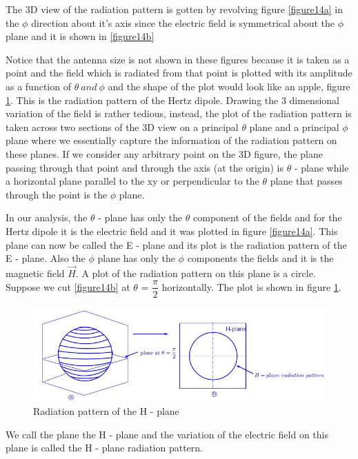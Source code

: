 The 3D view of the radiation pattern is gotten by revolving figure \ref{figure14a} in the $\phi$ direction about it's axis since the electric field is symmetrical about the $\phi$ plane and it is shown in \ref{figure14b}

Notice that the antenna size is not shown in these figures because it is taken as a point and the field which is radiated from that point is plotted with its amplitude as a function of $\theta \ and \ \phi$ and the shape of the plot would look like an apple, figure \ref{figure15}. This is the radiation pattern of the Hertz dipole. Drawing the 3 dimensional variation of the field is rather tedious, instead, the plot of the radiation pattern is taken across two sections of the 3D view on a principal $\theta$ plane and a principal $\phi$ plane where we essentially capture the information of the radiation pattern on these planes. If we consider any arbitrary point on the 3D figure, the plane passing through that point and through the axis (at the origin) is $\theta$ - plane while a horizontal plane parallel to the xy or perpendicular to the $\theta$ plane that passes through the point is the $\phi$ plane. 

In our analysis, the $\theta$ - plane has only the $\theta$ component of the fields and for the Hertz dipole it is the electric field and it was plotted in figure \ref{figure14a}. This plane can now be called the E - plane and its plot is the radiation pattern of the E - plane. Also the $\phi$ plane has only the $\phi$ components the fields and it is the magnetic field $\vec{H}$. A plot of the radiation pattern on this plane is a circle. Suppose we cut \ref{figure14b} at $\theta$ = $\dfrac{\pi}{2}$ horizontally. The plot is shown in figure \ref{figure15}.
\begin{figure}[h]
\centering
\includegraphics[width=0.8\linewidth]{./graphics/diagram4}
\caption{Radiation pattern of the H - plane}
\label{figure15}
\end{figure}

We call the plane the H - plane and the variation of the electric field on this plane is called the H - plane radiation pattern. 

